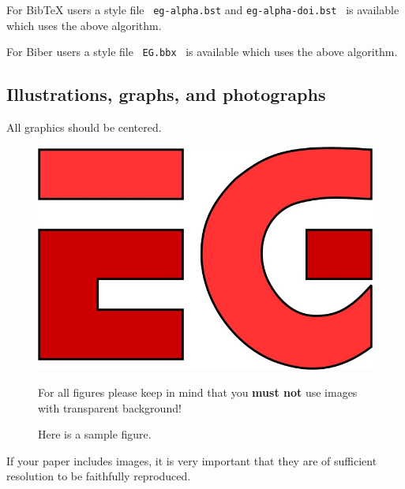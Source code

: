 For BibTeX users a style file \ \texttt{eg-alpha.bst} and 
\texttt{eg-alpha-doi.bst} \ is available which uses the above algorithm.

For Biber users a style file \ \texttt{EG.bbx} \ is available which uses the above algorithm.
\subsection{Illustrations, graphs, and photographs}

All graphics should be centered.

\begin{figure}[htb]
  \centering
  \includegraphics[width=.8\linewidth]{sampleFig}
  \parbox[t]{.9\columnwidth}{\relax
           For all figures please keep in mind that you \textbf{must not}
           use images with transparent background! 
           }
  \caption{\label{fig:firstExample}
           Here is a sample figure.}
\end{figure}

If your paper includes images, it is very important that they are of
sufficient resolution to be faithfully reproduced.

